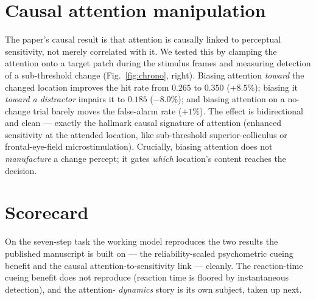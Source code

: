 \section{Causal attention manipulation}
The paper's causal result is that attention is causally linked to perceptual sensitivity,
not merely correlated with it. We tested this by clamping the attention onto a target
patch during the stimulus frames and measuring detection of a sub-threshold change
(Fig.~\ref{fig:chrono}, right). Biasing attention \emph{toward} the changed location
improves the hit rate from $0.265$ to $0.350$ ($+8.5\%$); biasing it \emph{toward a
distractor} impairs it to $0.185$ ($-8.0\%$); and biasing attention on a no-change trial
barely moves the false-alarm rate ($+1\%$). The effect is bidirectional and clean ---
exactly the hallmark causal signature of attention (enhanced sensitivity at the attended
location, like sub-threshold superior-colliculus or frontal-eye-field microstimulation).
Crucially, biasing attention does not \emph{manufacture} a change percept; it gates
\emph{which} location's content reaches the decision.

\section{Scorecard}
On the seven-step task the working model reproduces the two results the published
manuscript is built on --- the reliability-scaled psychometric cueing benefit and the
causal attention-to-sensitivity link --- cleanly. The reaction-time cueing benefit does not
reproduce (reaction time is floored by instantaneous detection), and the attention-
\emph{dynamics} story is its own subject, taken up next.

